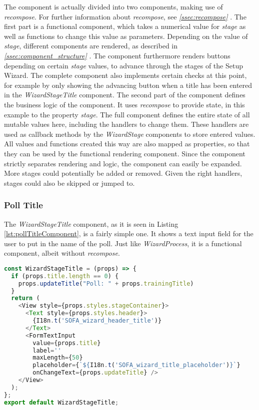 The component is actually divided into two components, making use of \textit{recompose}. For further information about \textit{recompose}, see \textit{\ref{ssec:recompose} }. The first part is a functional component, which takes a numerical value for \textit{stage} as well as functions to change this value as parameters. Depending on the value of \textit{stage}, different components are rendered, as described in \textit{\ref{ssec:component_structure} }. The component furthermore renders buttons depending on certain \textit{stage} values, to advance through the stages of the Setup Wizard. The complete component also implements certain checks at this point, for example by only showing the advancing button when a title has been entered in the \textit{WizardStageTitle} component.
\newline
The second part of the component defines the business logic of the component. It uses \textit{recompose} to provide state, in this example to the property \textit{stage}. The full component defines the entire state of all mutable values here, including the handlers to change them. These handlers are used as callback methods by the \textit{WizardStage} components to store entered values. All values and functions created this way are also mapped as properties, so that they can be used by the functional rendering component.
\newline
Since the component strictly separates rendering and logic, the component can easily be expanded. More stages could potentially be added or removed. Given the right handlers, stages could also be skipped or jumped to.

\subsubsection{Poll Title}
\label{sssec:poll_title}

The \textit{WizardStageTitle} component, as it is seen in Listing \ref{lst:pollTitleComponent}, is a fairly simple one. It shows a text input field for the user to put in the name of the poll. Just like \textit{WizardProcess}, it is a functional component, albeit without \textit{recompose}.

\begin{lstlisting}[language=javascript,caption=Simplified Poll Title Component,label=lst:pollTitleComponent]
const WizardStageTitle = (props) => {
  if (props.title.length == 0) {
    props.updateTitle("Poll: " + props.trainingTitle)
  }
  return (
    <View style={props.styles.stageContainer}>
      <Text style={props.styles.header}>
        {I18n.t('SOFA_wizard_header_title')}
      </Text>
      <FormTextInput
        value={props.title}
        label=''
        maxLength={50}
        placeholder={`${I18n.t('SOFA_wizard_title_placeholder')}`}
        onChangeText={props.updateTitle} />
    </View>
  );
};
export default WizardStageTitle;
\end{lstlisting}

